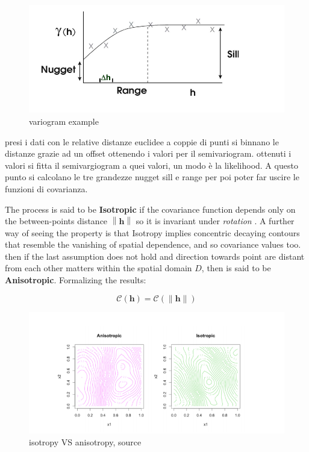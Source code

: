 \documentclass[
  12pt,
  a4paper,
  oneside]{book}
\theoremstyle{definition}
\theoremstyle{definition}
\theoremstyle{definition}
\theoremstyle{remark}
\begin{document}
\begin{figure}
\centering
\includegraphics{images/variogram.png}
\caption{variogram example}
\end{figure}

presi i dati con le relative distanze euclidee a coppie di punti si binnano le distanze grazie ad un offset ottenendo i valori per il semivariogram. ottenuti i valori si fitta il semivargiogram a quei valori, un modo è la likelihood. A questo punto si calcolano le tre grandezze nugget sill e range per poi poter far uscire le funzioni di covarianza.

The process is said to be \textbf{Isotropic} if the covariance function depends only on the between-points distance \(\left\|\mathbf{h}\right\|\) so it is invariant under \emph{rotation} \citeyearpar{Krainski-Rubio}. A further way of seeing the property is that Isotropy implies concentric decaying contours that resemble the vanishing of spatial dependence, and so covariance values too.
then if the last assumption does not hold and direction towards point are distant from each other matters within the spatial domain \(D\), then is said to be \textbf{Anisotropic}.
Formalizing the results:

\[\mathcal{C}(\mathbf{h})=\mathcal{C}(\|\mathbf{h}\|)\]

\begin{figure}
\centering
\includegraphics{images/isotropyVSanisotropy.png}
\caption{isotropy VS anisotropy, source \citet{blanchetscalliet}}
\end{figure}
\end{document}
